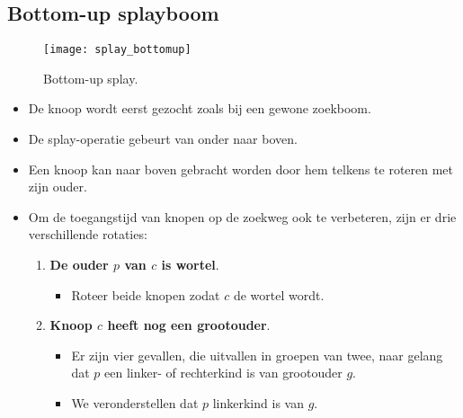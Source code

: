 \subsection{Bottom-up splayboom}
\begin{figure}[ht]
    \centering
    \texttt{[image: splay\_bottomup]}
    \caption{Bottom-up splay.}
    \label{fig:splay_bottomup}
\end{figure}
\begin{itemize}
    \item De knoop wordt eerst gezocht zoals bij een gewone zoekboom.
    \item De splay-operatie gebeurt van onder naar boven.
    \item Een knoop kan naar boven gebracht worden door hem telkens te roteren met zijn ouder.
    \item Om de toegangstijd van knopen op de zoekweg ook te verbeteren, zijn er drie verschillende rotaties:
    \begin{enumerate}
        \item \textbf{De ouder $p$ van $c$ is wortel}. 
        \begin{itemize}
            \item Roteer beide knopen zodat $c$ de wortel wordt.
        \end{itemize}
        \item \textbf{Knoop $c$ heeft nog een grootouder}.
        \begin{itemize}
            \item Er zijn vier gevallen, die uitvallen in groepen van twee, naar gelang dat $p$ een linker- of rechterkind is van grootouder $g$.
            \item We veronderstellen dat $p$ linkerkind is van $g$.
        \end{itemize}
        

\end{enumerate}
\end{itemize}
